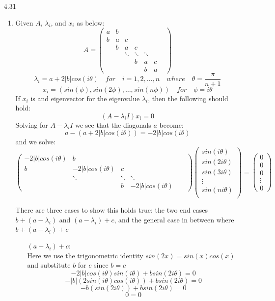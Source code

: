 \documentclass[11pt,a4paper]{article}
\begin{document}
\begin{itemize}
			\item[4.31]
				\begin{enumerate} [label={\alph*)}]
					\item Given $A$, $\lambda_i$, and $x_i$ as below:
					$$A = 
					\begin{pmatrix}
						a & b &      &      &       &    \\
						b & a & c    &      &       &    \\
						  & b & a    & c    &       &    \\
						  &   &\ddots&\ddots&\ddots &    \\
						  &   &      &  b   &   a   & c  \\
						  &   &      &      &   b   & a  &        					
					\end{pmatrix}$$
					$$\lambda_i = a + 2\vert b \vert cos(i\theta) \quad for \quad i=1,2,\dots,n \quad where \quad \theta = \frac{\pi}{n+1}$$
					$$x_i = (sin(\phi) , sin(2\phi),\dots,sin(n\phi)) \quad for \quad \phi = i\theta$$
					If $x_i$ is and eigenvector for the eigenvalue $\lambda_i$, then the following should hold:
					$$(A-\lambda_i I)x_i = 0$$
					Solving for $A-\lambda_i I$ we see that the diagonals $a$ become:
					$$a-(a+ 2\vert b \vert cos(i\theta)) =  -2\vert b \vert cos(i\theta)$$ and we solve:
					$$\begin{pmatrix}
						-2\vert b \vert cos(i\theta) & b & \\
						b & -2\vert b \vert cos(i\theta) & c \\
						  &\ddots&\ddots&\ddots& &\\
						  &   &      b    & -2\vert b \vert cos(i\theta)       					
					\end{pmatrix}
					\begin{pmatrix}
					sin(i\theta) \\
					sin(2i\theta) \\
					sin(3i\theta) \\
					\vdots\\
					sin(ni\theta) \\
					\end{pmatrix} = 
					\begin{pmatrix}
					0\\0\\0\\ \vdots \\ 0
					\end{pmatrix}$$
					
					There are three cases to show this holds true: the two end cases $b+(a-\lambda_i)$ and $(a - \lambda_i) + c$, and the general case in between where $b+(a-\lambda_i)+c$ \\
					\begin{enumerate}
						\item [$(a - \lambda_i) + c$:] ~
						\\ Here we use the trigonometric identity $sin(2x) = sin(x)cos(x)$ and substitute $b$ for $c$ since $b=c$
						$$-2\vert b \vert cos(i\theta)sin(i\theta) + b sin(2i\theta) = 0$$
						$$-\vert b \vert (2sin(i\theta)cos(i\theta)) + b sin(2i\theta) = 0$$
						$$-b(sin(2i\theta)) + b sin(2i\theta) = 0$$
						$$ 0 = 0$$
						

\end{enumerate}
\end{enumerate}
\end{itemize}
\end{document}

